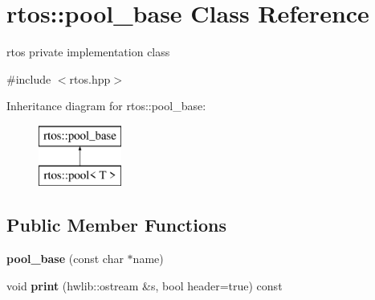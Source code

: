 \hypertarget{classrtos_1_1pool__base}{}\section{rtos\+:\+:pool\+\_\+base Class Reference}
\label{classrtos_1_1pool__base}


rtos private implementation class  




{\ttfamily \#include $<$rtos.\+hpp$>$}

Inheritance diagram for rtos\+:\+:pool\+\_\+base\+:\begin{figure}[H]
\begin{center}
\leavevmode
\includegraphics[height=2.000000cm]{classrtos_1_1pool__base}
\end{center}
\end{figure}
\subsection*{Public Member Functions}
\begin{DoxyCompactItemize}
\item 
{\bfseries pool\+\_\+base} (const char $\ast$name)\hypertarget{classrtos_1_1pool__base_a80e1aa93f3b8892060339f8ced055a1c}{}\label{classrtos_1_1pool__base_a80e1aa93f3b8892060339f8ced055a1c}

\item 
void {\bfseries print} (hwlib\+::ostream \&s, bool header=true) const \hypertarget{classrtos_1_1pool__base_ad4933e03799b48987874803a17065a05}{}\label{classrtos_1_1pool__base_ad4933e03799b48987874803a17065a05}

\end{DoxyCompactItemize}
